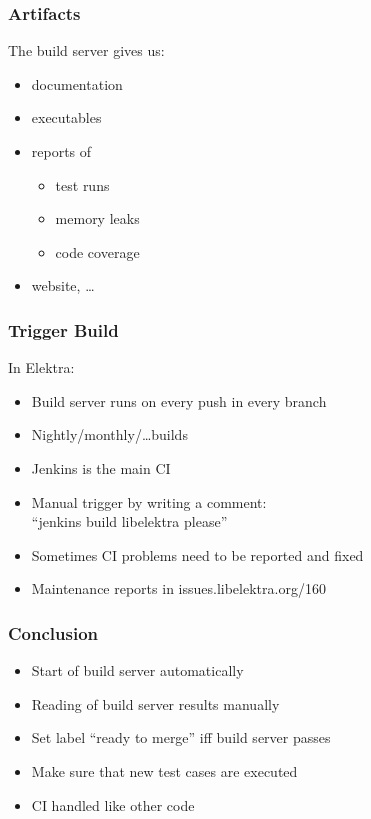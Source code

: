 \begin{frame}
	\frametitle{Artifacts}

	The build server gives us:

	\begin{itemize}[<+-| alert@+>]
	\item documentation
	\item executables
	\item reports of
	\begin{itemize}
	\item test runs
	\item memory leaks
	\item code coverage
	\end{itemize}
	\item website, \dots
	\end{itemize}
\end{frame}

\begin{frame}[label=trigger build]
	\frametitle{Trigger Build}

	In Elektra:
	\begin{itemize}[<+-| alert@+>]
	\item Build server runs on every push in every branch
	\item Nightly/monthly/\dots builds
	\item Jenkins is the main CI
	\item Manual trigger by writing a comment: \\ ``jenkins build libelektra please''
	\item Sometimes CI problems need to be reported and fixed
	\item Maintenance reports in issues.libelektra.org/160
	\end{itemize}
\end{frame}

\begin{frame}
	\frametitle{Conclusion}

	\begin{itemize}[<+-| alert@+>]
	\item Start of build server automatically
	\item Reading of build server results manually
	\item Set label ``ready to merge'' iff build server passes
	\item Make sure that new test cases are executed
	\item CI handled like other code
	\end{itemize}
\end{frame}

